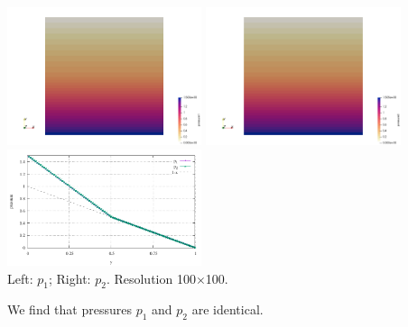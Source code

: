 \begin{center}
\includegraphics[width=5.7cm]{python_codes/fieldstone_119/results/exp2/p1}
\includegraphics[width=5.7cm]{python_codes/fieldstone_119/results/exp2/p2}
\includegraphics[width=5.7cm]{python_codes/fieldstone_119/results/exp2/profile.pdf}\\
{\captionfont Left: $p_1$; Right: $p_2$. Resolution 100$\times$100.}
\end{center}

We find that pressures $p_1$ and $p_2$ are identical.

